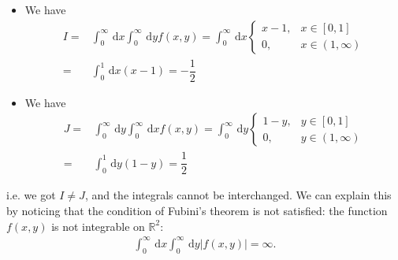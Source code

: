 \documentclass[11pt,a4paper]{article}
\numberwithin{equation}{section}%
\begin{document}
\begin{itemize}[topsep=2pt,itemsep=0pt]
    \item We have
    \begin{align*}
        I =& \int_0^\infty \,\mathrm{d}x\int_0^\infty \,\mathrm{d}y f(x,y) = \int_0^\infty \,\mathrm{d}x \begin{cases}
            x-1, & x\in [0,1]\\
            0, & x\in (1,\infty)
        \end{cases}\\
        =& \int_0^1 \,\mathrm{d}x (x-1) = -\dfrac{1}{2}
    \end{align*}

    \item We have
    \begin{align*}
        J=& \int_0^\infty \,\mathrm{d}y\int_0^\infty \,\mathrm{d}x f(x,y) = \int_0^\infty \,\mathrm{d}y \begin{cases}
            1-y, & y\in [0,1]\\
            0, & y\in (1,\infty) 
        \end{cases}\\
        =& \int_0^1 \,\mathrm{d}y (1-y) = \dfrac{1}{2}
    \end{align*}
\end{itemize}

i.e. we got $ I\neq J $, and the integrals cannot be interchanged. We can explain this by noticing that the condition of Fubini's theorem is not satisfied: the function $ f(x,y) $ is not integrable on $ \mathbb{R}^2 $:
\begin{align*}
    \int_0^\infty \,\mathrm{d}x\int_0^\infty \,\mathrm{d}y \left\vert f(x,y) \right\vert =\infty.
\end{align*}



    


    
\end{document}
